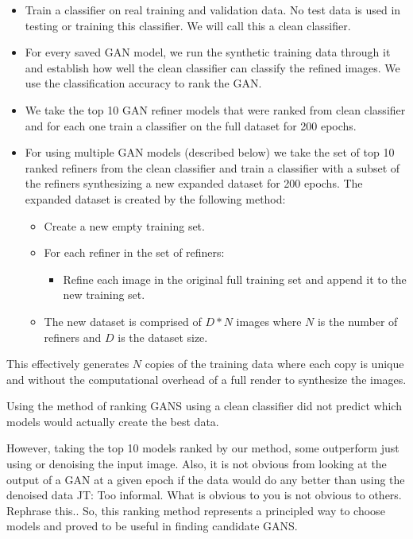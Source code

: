 \documentclass[10pt,twocolumn,letterpaper]{article}
\newcommand{\tompson}[1]{{\color{green} JT: #1}}
\begin{document}
\begin{itemize}
\item Train a classifier on real training and validation data.  No test data is used in testing or training this classifier.  We will call this a clean classifier.
\item For every saved GAN model, we run the synthetic training data through it and establish how well the clean classifier can classify the refined images. We use the classification accuracy to rank the GAN.
\item We take the top 10 GAN refiner models that were ranked from clean classifier and for each one train a classifier on the full dataset for 200 epochs.  
\item For using multiple GAN models (described below) we take the set of top 10 ranked refiners from the clean classifier and train a classifier with a subset of the refiners synthesizing a new expanded dataset for 200 epochs. The expanded dataset is created by the following method:
\begin{itemize}
\item Create a new empty training set.
\item For each refiner in the set of refiners:
\begin{itemize}
\item Refine each image in the original full training set and append it to the new training set.
\end{itemize}
\item The new dataset is comprised of $D * N$ images where $N$ is the number of refiners and $D$ is the dataset size.
\end{itemize}
\end{itemize}

This effectively generates $N$ copies of the training data where each copy is unique and without the computational overhead of a full render to synthesize the images.

Using the method of ranking GANS using a clean classifier did not predict which models would actually create the best data. 

However, taking the top 10 models ranked by our method, some outperform just using or denoising the input image.  Also, it is not obvious from looking at the output of a GAN at a given epoch if the data would do any better than using the denoised data \tompson{Too informal. What is obvious to you is not obvious to others. Rephrase this.}.  So, this ranking method represents a principled way to choose models and proved to be useful in finding candidate GANS.
\end{document}
